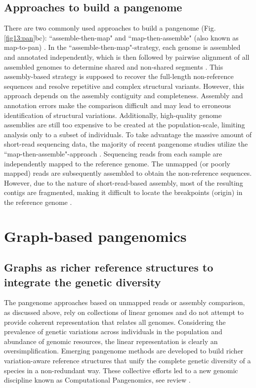 \documentclass[../main.tex]{subfiles}
\begin{document}
\subsection*{Approaches to build a pangenome}
There are two commonly used approaches to build a pangenome (Fig. \ref{fig13:pan}bc): “assemble-then-map" and “map-then-assemble" (also known as map-to-pan) \citep{golicz2020pangenomics}. In the “assemble-then-map"-strategy, each genome is assembled and annotated independently, which is then followed by pairwise alignment of all assembled genomes to determine shared and non-shared segments \citep{duan2019hupan,li2019towards,eisfeldt2020discovery}. This assembly-based strategy is supposed to recover the full-length non-reference sequences and resolve repetitive and complex structural variants. However, this approach depends on the assembly contiguity and completeness. Assembly and annotation errors make the comparison difficult and may lead to erroneous identification of structural variations. Additionally, high-quality genome assemblies are still too expensive to be created at the population-scale, limiting analysis only to a subset of individuals. To take advantage the massive amount of short-read sequencing data, the majority of  recent pangenome studies utilize the “map-then-assemble"-approach \citep{holden2018assembly,laine2019exploring,sherman2019assembly}. Sequencing reads from each sample are independently mapped to the reference genome. The  unmapped (or poorly mapped) reads are subsequently assembled to obtain the non-reference sequences. However, due to the nature of short-read-based assembly, most of the resulting contigs are fragmented, making it difficult to locate the breakpoints (origin) in the reference genome \citep{sherman2019assembly}. 

\section{Graph-based pangenomics}

\subsection*{Graphs as richer reference structures to integrate the genetic diversity}

The pangenome approaches based on unmapped reads or assembly comparison, as discussed above, rely on collections of linear genomes and do not attempt to provide coherent representation that relates all genomes. Considering the prevalence of genetic variations across individuals in the population and abundance of genomic resources, the linear representation is clearly an oversimplification. Emerging pangenome methods are developed to build richer variation-aware reference structures that unify the complete genetic diversity of a species in a non-redundant way. These collective efforts led to a new genomic discipline known as Computational Pangenomics, see review \citep{paten2017genome,computational2018computational,eizenga2020pangenome}.
\end{document}
